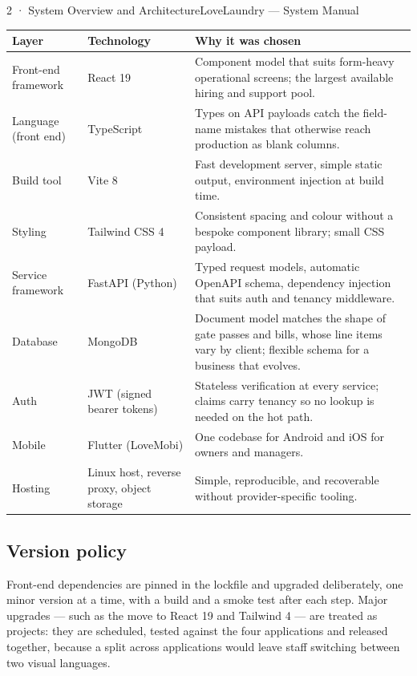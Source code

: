 \documentclass[11pt,a4paper,oneside]{book}
\begin{document}
2 · System Overview and ArchitectureLoveLaundry — System Manual

\begin{center}\small
\begin{tabularx}{\linewidth}{|X|X|X|}
\hline
\rowcolor{lightgrey}
\textbf{Layer} & \textbf{Technology} & \textbf{Why it was chosen} \\ \hline
Front-end framework & React 19 & Component model that suits form-heavy operational screens; the largest available hiring and support pool. \\ \hline
Language (front end) & TypeScript & Types on API payloads catch the field-name mistakes that otherwise reach production as blank columns. \\ \hline
Build tool & Vite 8 & Fast development server, simple static output, environment injection at build time. \\ \hline
Styling & Tailwind CSS 4 & Consistent spacing and colour without a bespoke component library; small CSS payload. \\ \hline
Service framework & FastAPI (Python) & Typed request models, automatic OpenAPI schema, dependency injection that suits auth and tenancy middleware. \\ \hline
Database & MongoDB & Document model matches the shape of gate passes and bills, whose line items vary by client; flexible schema for a business that evolves. \\ \hline
Auth & JWT (signed bearer tokens) & Stateless verification at every service; claims carry tenancy so no lookup is needed on the hot path. \\ \hline
Mobile & Flutter (LoveMobi) & One codebase for Android and iOS for owners and managers. \\ \hline
Hosting & Linux host, reverse proxy, object storage & Simple, reproducible, and recoverable without provider-specific tooling. \\ \hline
\end{tabularx}
\end{center}
\subsection*{Version policy}
Front-end dependencies are pinned in the lockfile and upgraded deliberately, one minor version at a time, with a build and a smoke test after each step. Major upgrades — such as the move to React 19 and Tailwind 4 — are treated as projects: they are scheduled, tested against the four applications and released together, because a split across applications would leave staff switching between two visual languages.
\end{document}
